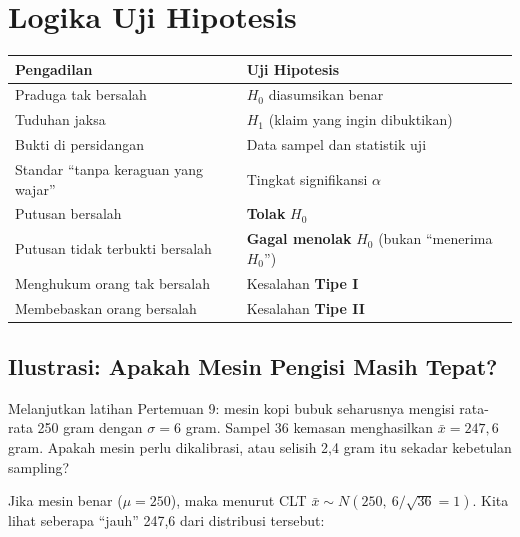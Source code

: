 \documentclass[
  indonesian,
  letterpaper,
]{book}
\newcounter{none} %
\begin{document}

\chapter{Logika Uji Hipotesis}\label{logika-uji-hipotesis}

{\def\LTcaptype{none} %
\begin{longtable}[]{@{}
  >{\raggedright\arraybackslash}p{}
  >{\raggedright\arraybackslash}p{}@{}}
\toprule\noalign{}
\begin{minipage}[b]{\linewidth}\raggedright
Pengadilan
\end{minipage} & \begin{minipage}[b]{\linewidth}\raggedright
Uji Hipotesis
\end{minipage} \\
\midrule\noalign{}
\endhead
\bottomrule\noalign{}
\endlastfoot
Praduga tak bersalah & \(H_0\) diasumsikan benar \\
Tuduhan jaksa & \(H_1\) (klaim yang ingin dibuktikan) \\
Bukti di persidangan & Data sampel dan statistik uji \\
Standar ``tanpa keraguan yang wajar'' & Tingkat signifikansi
\(\alpha\) \\
Putusan bersalah & \textbf{Tolak} \(H_0\) \\
Putusan tidak terbukti bersalah & \textbf{Gagal menolak} \(H_0\) (bukan
``menerima \(H_0\)'') \\
Menghukum orang tak bersalah & Kesalahan \textbf{Tipe I} \\
Membebaskan orang bersalah & Kesalahan \textbf{Tipe II} \\
\end{longtable}
}

\section{Ilustrasi: Apakah Mesin Pengisi Masih
Tepat?}\label{ilustrasi-apakah-mesin-pengisi-masih-tepat}

Melanjutkan latihan Pertemuan 9: mesin kopi bubuk seharusnya mengisi
rata-rata 250 gram dengan \(\sigma = 6\) gram. Sampel 36 kemasan
menghasilkan \(\bar{x} = 247{,}6\) gram. Apakah mesin perlu dikalibrasi,
atau selisih 2,4 gram itu sekadar kebetulan sampling?

Jika mesin benar (\(\mu = 250\)), maka menurut CLT
\(\bar{x} \sim N(250,\ 6/\sqrt{36} = 1)\). Kita lihat seberapa ``jauh''
247,6 dari distribusi tersebut:
\end{document}

